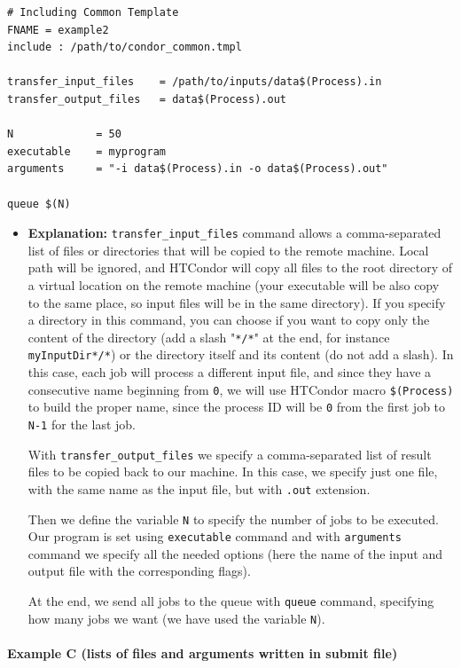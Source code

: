 \documentclass[a4paper,10pt]{article}
\begin{document}
\begin{verbatim}
# Including Common Template
FNAME = example2
include : /path/to/condor_common.tmpl

transfer_input_files    = /path/to/inputs/data$(Process).in
transfer_output_files   = data$(Process).out

N             = 50
executable    = myprogram
arguments     = "-i data$(Process).in -o data$(Process).out"

queue $(N)
\end{verbatim}

\begin{itemize}
\item \textbf{Explanation:}
\texttt{transfer\_input\_files} command allows a comma-separated list of files or
directories that will be copied to the remote machine. Local path will be
ignored, and HTCondor will copy all files to the root directory of a virtual
location on the remote machine (your executable will be also copy to the same
place, so input files will be in the same directory). If you specify a directory
in this command, you can choose if you want to copy only the content of the
directory (add a slash "\texttt{*/*}" at the end, for instance \texttt{myInputDir*/*}) or the
directory itself and its content (do not add a slash). In this case, each job
will process a different input file, and since they have a consecutive name
beginning from \texttt{0}, we will use HTCondor macro \texttt{\$(Process)} to build the proper
name, since the process ID will be \texttt{0} from the first job to \texttt{N-1} for the last
job.

With \texttt{transfer\_output\_files} we specify a comma-separated list of result files
to be copied back to our machine. In this case, we specify just one file, with
the same name as the input file, but with \texttt{.out} extension.

Then we define the variable \texttt{N} to specify the number of jobs to be
executed. Our program is set using \texttt{executable} command and with \texttt{arguments}
command we specify all the needed options (here the name of the input and output
file with the corresponding flags).

At the end, we send all jobs to the queue with \texttt{queue} command, specifying how
many jobs we want (we have used the variable \texttt{N}).
\end{itemize}


\paragraph{\textbf{Example C} (lists of files and arguments written in submit file)}
\label{sec:orgf129954}
\end{document}
